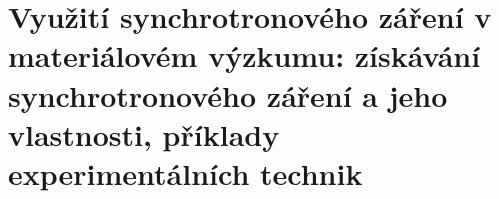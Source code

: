\section[Využití synchrotronového záření v materiálovém výzkumu]{Využití synchrotronového záření v materiálovém výzkumu: získávání synchrotronového záření a jeho vlastnosti, příklady experimentálních technik}

